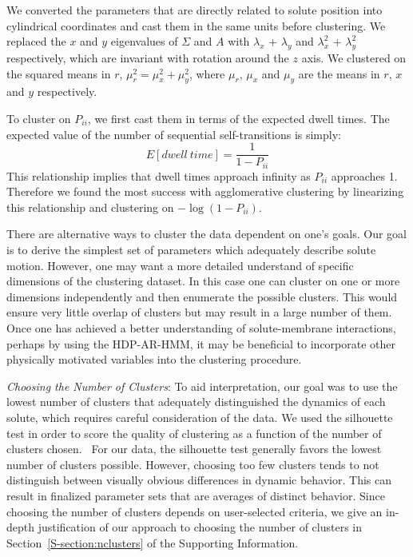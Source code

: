 \documentclass[journal=jpcbfk,manuscript=article]{achemso}
\begin{document}
  We converted the parameters that are directly related to solute position into 
  cylindrical coordinates and cast them in the same units before clustering. 
  We replaced the $x$ and $y$ eigenvalues of $\Sigma$ and $A$ with $\lambda_x$ + 
  $\lambda_y$ and $\lambda_x^2$ + $\lambda_y^2$ respectively, which are invariant with 
  rotation around the $z$ axis. We clustered on the squared means in $r$, $\mu_r^2 = 
  \mu_x^2 + \mu_y^2$, where $\mu_r$, $\mu_x$ and $\mu_y$ are the means in $r$, $x$ and
  $y$ respectively.

  To cluster on $P_{ii}$, we first cast them in terms of the expected dwell times. The expected
  value of the number of sequential self-transitions is simply:
  \begin{equation}  
   E[dwell~time] = \frac{1}{1 - P_{ii}}
   \label{eqn:dwell_times}
  \end{equation}  
  This relationship implies that dwell times approach infinity as $P_{ii}$ approaches
  1. Therefore we found the most success with agglomerative clustering by linearizing this
  relationship and clustering on $-\log(1 - P_{ii})$.
  
  There are alternative ways to cluster the data dependent on one's goals. Our goal is
  to derive the simplest set of parameters which adequately describe solute motion. 
  However, one may want a more detailed understand of specific dimensions of the 
  clustering dataset. In this case one can cluster on one or more dimensions independently
  and then enumerate the possible clusters. This would ensure very little overlap of
  clusters but may result in a large number of them. Once one has achieved a better 
  understanding of solute-membrane interactions, perhaps by using the HDP-AR-HMM, it may be
  beneficial to incorporate other physically motivated variables into the clustering
  procedure. 

  \textit{Choosing the Number of Clusters}: To aid interpretation, our goal was to
  use the lowest number of clusters that adequately distinguished the dynamics of 
  each solute, which requires careful consideration of the data. We used the silhouette
  test in order to score the quality of clustering as a function of the number of clusters
  chosen.~\cite{kaufman_finding_2009} For our data, the silhouette test generally favors 
  the lowest number of clusters possible. However, choosing too few clusters tends to not
  distinguish between visually obvious differences in dynamic behavior. This can result 
  in finalized parameter sets that are averages of distinct behavior. Since choosing 
  the number of clusters depends on user-selected criteria, we give an in-depth 
  justification of our approach to choosing the number of clusters in 
  Section~\ref{S-section:nclusters} of the Supporting Information.  
  
\end{document}
